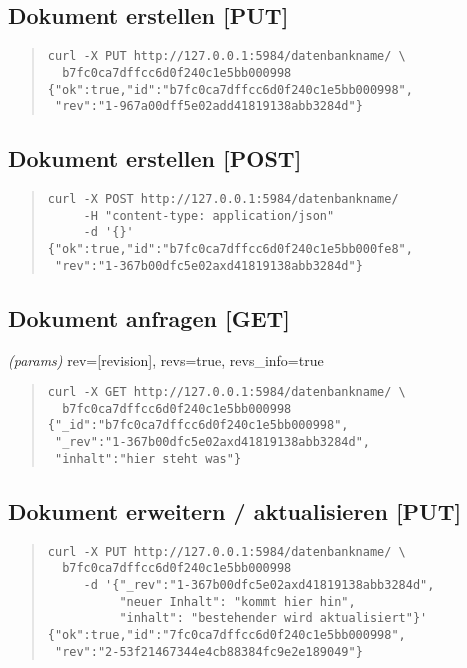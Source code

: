 \documentclass[19pt,landscape,twocolumn]{article}
\newcommand{\htmlverb}[1]{{[}\textbf{{#1}}{]}}
\begin{document}
\subsection{Dokument erstellen \htmlverb{PUT}}
\begin{quote}
\begin{verbatim}
curl -X PUT http://127.0.0.1:5984/datenbankname/ \
  b7fc0ca7dffcc6d0f240c1e5bb000998
{"ok":true,"id":"b7fc0ca7dffcc6d0f240c1e5bb000998",
 "rev":"1-967a00dff5e02add41819138abb3284d"}
\end{verbatim}
\end{quote}

\subsection{Dokument erstellen \htmlverb{POST}}
\begin{quote}
\begin{verbatim}
curl -X POST http://127.0.0.1:5984/datenbankname/
     -H "content-type: application/json"
     -d '{}'
{"ok":true,"id":"b7fc0ca7dffcc6d0f240c1e5bb000fe8",
 "rev":"1-367b00dfc5e02axd41819138abb3284d"}
\end{verbatim}
\end{quote}

\subsection{Dokument anfragen \htmlverb{GET}}
\emph{(params)} rev={[}revision{]}, revs=true, revs\_info=true
\begin{quote}
\begin{verbatim}
curl -X GET http://127.0.0.1:5984/datenbankname/ \
  b7fc0ca7dffcc6d0f240c1e5bb000998
{"_id":"b7fc0ca7dffcc6d0f240c1e5bb000998",
 "_rev":"1-367b00dfc5e02axd41819138abb3284d",
 "inhalt":"hier steht was"}
\end{verbatim}
\end{quote}

\subsection{Dokument erweitern / aktualisieren \htmlverb{PUT}}
\begin{quote}
\begin{verbatim}
curl -X PUT http://127.0.0.1:5984/datenbankname/ \
  b7fc0ca7dffcc6d0f240c1e5bb000998
     -d '{"_rev":"1-367b00dfc5e02axd41819138abb3284d",
          "neuer Inhalt": "kommt hier hin",
          "inhalt": "bestehender wird aktualisiert"}'
{"ok":true,"id":"7fc0ca7dffcc6d0f240c1e5bb000998",
 "rev":"2-53f21467344e4cb88384fc9e2e189049"}
\end{verbatim}
\end{quote}
\end{document}
